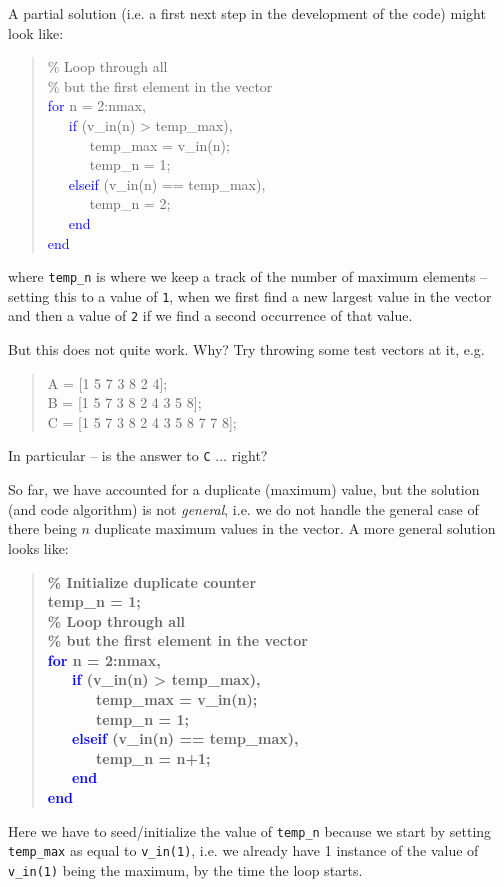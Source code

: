 \documentclass{tufte-book} %
\newenvironment{docspec}{\begin{quotation}\ttfamily\parskip0pt\parindent0pt\ignorespaces}{\end{quotation}}
\newenvironment{docspecbold}{\begin{quotation}\ttfamily\bfseries\parskip0pt\parindent0pt\ignorespaces}{\end{quotation}}
\begin{document}
A partial solution (i.e. a first next step in the development of the code) might look like:
\begin{docspec}
\textcolor[rgb]{0,0.501961,0}{\% Loop through all \\ \% but the first element in the vector}\\
\textcolor{blue}{for} n = 2:nmax,\\
\ \ \ \textcolor{blue}{if} (v\_in(n) > temp\_max),\\
\ \ \ \ \ \ temp\_max = v\_in(n);\\
\ \ \ \ \ \ temp\_n = 1;\\
\ \ \ \textcolor{blue}{elseif} (v\_in(n) == temp\_max),\\
\ \ \ \ \ \ temp\_n = 2;\\
\ \ \ \textcolor{blue}{end}\\
\textcolor{blue}{end}
\end{docspec}
where \texttt{temp\_n} is where we keep a track of the number of maximum elements -- setting this to a value of \texttt{1}, when we first find a new largest value in the vector and then a value of \texttt{2} if we find a second occurrence of that value.

But this does not quite work. Why? Try throwing some test vectors at it, e.g.
\begin{docspec}
A = [1 5 7 3 8 2 4];\\
B = [1 5 7 3 8 2 4 3 5 8];\\
C = [1 5 7 3 8 2 4 3 5 8 7 7 8];
\end{docspec}
In particular -- is the answer to \texttt{C} ... right?

So far, we have accounted for a duplicate (maximum) value, but the solution (and code algorithm) is not \textit{general}, i.e. we do not handle the general case of there being \(n\) duplicate maximum values in the vector. A more general solution looks like:
\begin{docspecbold}
\textcolor[rgb]{0,0.501961,0}{\% Initialize duplicate counter}\\
temp\_n = 1;\\
\textcolor[rgb]{0,0.501961,0}{\% Loop through all \\ \% but the first element in the vector}\\
\textcolor{blue}{for} n = 2:nmax,\\
\ \ \ \textcolor{blue}{if} (v\_in(n) > temp\_max),\\
\ \ \ \ \ \ temp\_max = v\_in(n);\\
\ \ \ \ \ \ temp\_n = 1;\\
\ \ \ \textcolor{blue}{elseif} (v\_in(n) == temp\_max),\\
\ \ \ \ \ \ temp\_n = n+1;\\
\ \ \ \textcolor{blue}{end}\\
\textcolor{blue}{end}
\end{docspecbold}
Here we have to seed/initialize the value of \texttt{temp\_n} because we start by setting \texttt{temp\_max} as equal to \texttt{v\_in(1)}, i.e. we already have 1 instance of the value of \texttt{v\_in(1)} being the maximum, by the time the loop starts.
\end{document}
